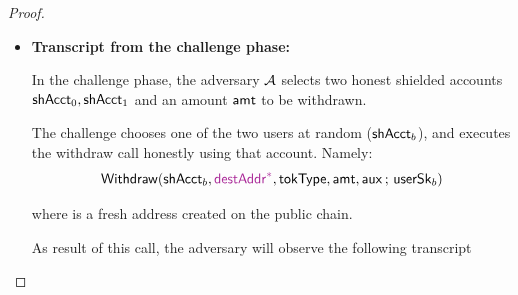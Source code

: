\begin{proof}
\begin{itemize} [label=$\blacksquare$]
\begin{itemize}
\begin{TxtBox}{trn:redeem}{Transcript for the $\Redeem$ flow.}
\vspace{5pt}
\begin{OutList}
\oitem{\Dvault} .
\oitem{\Dshd} .
\oitem{\stmt} \upd{$\bigl(\cktRefundRedeem,\; \rid,\; \attSig,\; \redeemView[\rid],\; \Dvault,\;
  \Dshd\bigr)$}.
\oitem{\Rel} .
\end{OutList}

\end{TxtBox}

\end{itemize}

    \item \textbf{Transcript from the challenge phase:}

    In the challenge phase, the adversary $\mathcal{A}$ selects
    two honest shielded accounts  $\mathsf{shAcct}_0, \mathsf{shAcct}_1$ and an amount $\mathsf{amt}$ to be withdrawn.

    The challenge chooses one of the two users at random ($\mathsf{shAcct}_b$), and  executes the withdraw call honestly using that account. Namely:
          $$\Withdraw(\candB, \freshrn{\destAddr^*}, \tokType, \amt, \auxx \,;\, \usersk_b) $$

          where \freshrn{$\destAddr^*$} is a fresh address created on the public chain.


As result of this call, the adversary will observe the following transcript



\end{itemize}
\end{proof}
